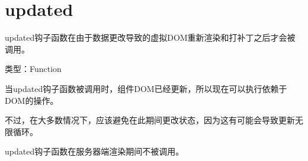 \begin{lstlisting}[language=JavaScript]

\end{lstlisting}




\section{updated}


updated钩子函数在由于数据更改导致的虚拟DOM重新渲染和打补丁之后才会被调用。


\begin{compactitem}
\item 类型：Function
\end{compactitem}

当updated钩子函数被调用时，组件DOM已经更新，所以现在可以执行依赖于DOM的操作。

不过，在大多数情况下，应该避免在此期间更改状态，因为这有可能会导致更新无限循环。

updated钩子函数在服务器端渲染期间不被调用。





\begin{lstlisting}[language=JavaScript]

\end{lstlisting}




\begin{lstlisting}[language=JavaScript]

\end{lstlisting}




\begin{lstlisting}[language=JavaScript]

\end{lstlisting}




\begin{lstlisting}[language=JavaScript]

\end{lstlisting}




\begin{lstlisting}[language=JavaScript]

\end{lstlisting}




\begin{lstlisting}[language=JavaScript]

\end{lstlisting}






